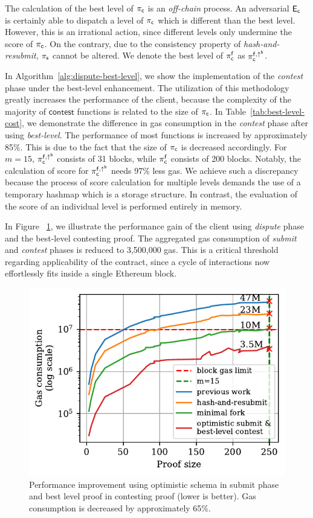 The calculation of the best level of $\mathsf{\pi_{c}}$ is an \emph{off-chain} process.
An adversarial $\mathsf{E_{c}}$ is certainly able to dispatch a level of $\mathsf{\pi_{c}}$ which is
different than the best level. However, this is an irrational action, since
different levels only undermine the score of $\mathsf{\pi_{c}}$. On the contrary, due to
the consistency property of \emph{hash-and-resubmit}, $\mathsf{\pi_{s}}$ cannot be altered.
We denote the best level of $\mathsf{\pi_{c}^{f}}$ as $\mathsf{\pi_{c}^{f, \uparrow^{b}}}$.

In Algorithm~\ref{alg:dispute-best-level}, we show the implementation of the
\emph{contest} phase under the best-level enhancement. The utilization of
this methodology greatly increases the performance of the client,
because the complexity of the majority of $\textsf{contest}$ functions is
related to the size of $\mathsf{\pi_{c}}$. In Table~\ref{tab:best-level-cost}, we
demonstrate the difference in gas consumption in the \emph{contest} phase after
using \emph{best-level}. The performance of most functions is increased by
approximately 85\%. This is due to the fact that the size of $\mathsf{\pi_{c}}$ is
decreased accordingly. For $m=15$, $\mathsf{\pi_{c}^{f, \uparrow^{b}}}$ consists of 31 blocks, while
$\mathsf{\pi_{c}^{f}}$ consists of 200 blocks.  Notably, the calculation of score for $\mathsf{\pi_{c}^{f, \uparrow^{b}}}$
needs 97\% less gas. We achieve such a discrepancy because the process of score
calculation for multiple levels demands the use of a temporary hashmap which is
a storage structure. In contrast, the evaluation of the score of an individual level
is performed entirely in memory.



In Figure ~\ref{fig:dispute-best-level}, we illustrate the performance gain of
the client using \emph{dispute} phase and the best-level contesting proof. The
aggregated gas consumption of \emph{submit} and \emph{contest} phases is
reduced to 3,500,000 gas. This is a critical threshold regarding applicability of
the contract, since a cycle of interactions now effortlessly fits inside a
single Ethereum block.



\begin{figure}[!h]
    \begin{center}
        \includegraphics[width=0.6\columnwidth]{figures/dispute-best-level.pdf}
    \end{center}
    \caption{Performance improvement using optimistic schema in submit phase
        and best level proof in contesting proof (lower is better). Gas
        consumption is decreased by approximately 65\%.}
    \label{fig:dispute-best-level}
\end{figure}
\newpage

